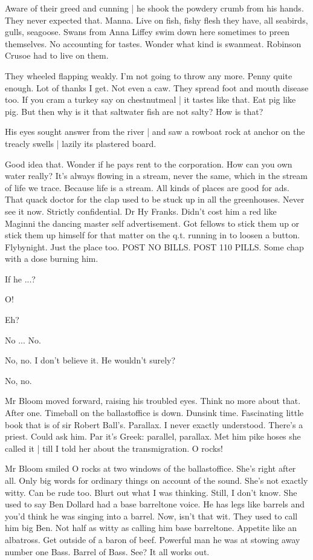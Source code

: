 Aware of their greed and cunning |
he shook the powdery crumb from his hands.
They never expected that.
Manna.
Live on fish,
fishy flesh they have,
all seabirds,
gulls,
seagoose.
Swans from Anna Liffey swim down here sometimes
to preen themselves.
No accounting for tastes.
Wonder what kind is swanmeat.
Robinson Crusoe had to live on them.

They wheeled flapping weakly.
I'm not going to throw any more.
Penny quite enough.
Lot of thanks I get.
Not even a caw.
They spread foot and mouth disease too.
If you cram a turkey say on chestnutmeal |
it tastes like that.
Eat pig like pig.
But then why is it that saltwater fish are not salty?
How is that?

His eyes sought answer from the river |
and saw a rowboat rock at anchor on the treacly swells |
lazily its plastered board.


Good idea that.
Wonder if he pays rent to the corporation.
How can you own water really?
It's always flowing in a stream,
never the same,
which in the stream of life we trace.
Because life is a stream.
All kinds of places are good for ads.
That quack doctor for the clap used to be stuck up in all the greenhouses.
Never see it now.
Strictly confidential.
Dr Hy Franks.
Didn't cost him a red
like Maginni the dancing master
self advertisement.
Got fellows to stick them up
or stick them up himself
for that matter
on the q.t. running in to loosen a button.
Flybynight.
Just the place too.
POST NO BILLS.
POST 110 PILLS.
Some chap with a dose burning him.

If he ...?

O!

Eh?

No ...
No.

No, no.
I don't believe it.
He wouldn't surely?

No, no.

Mr Bloom moved forward, raising his troubled eyes.
Think no more about that.
After one.
Timeball on the ballastoffice is down.
Dunsink time.
Fascinating little book that is of sir Robert Ball's.
Parallax.
I never exactly understood.
There's a priest.
Could ask him.
Par it's Greek:
parallel, parallax.
Met him pike hoses she called it |
till I told her about the transmigration.
O rocks!

Mr Bloom smiled O rocks at two windows of the ballastoffice.
She's right after all.
Only big words for ordinary things on account of the sound.
She's not exactly witty.
Can be rude too.
Blurt out what I was thinking.
Still, I don't know.
She used to say Ben Dollard had a base barreltone voice.
He has legs like barrels and you'd think he was singing into a barrel.
Now, isn't that wit.
They used to call him big Ben.
Not half as witty as calling him base barreltone.
Appetite like an albatross.
Get outside of a baron of beef.
Powerful man he was at stowing away number one Bass.
Barrel of Bass.
See?
It all works out.


